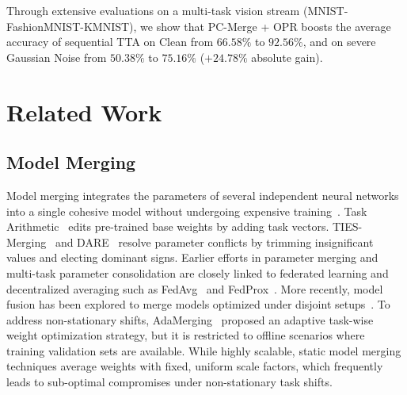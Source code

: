 \documentclass{article}
\theoremstyle{plain}
\theoremstyle{definition}
\theoremstyle{remark}
\begin{document}
Through extensive evaluations on a multi-task vision stream (MNIST-FashionMNIST-KMNIST), we show that PC-Merge + OPR boosts the average accuracy of sequential TTA on Clean from $66.58\%$ to $\mathbf{92.56\%}$, and on severe Gaussian Noise from $50.38\%$ to $\mathbf{75.16\%}$ ($+24.78\%$ absolute gain).

\section{Related Work}
\label{sec:related}

\subsection{Model Merging}
Model merging integrates the parameters of several independent neural networks into a single cohesive model without undergoing expensive training~\cite{wortsman2022robust, matena2021merging}. Task Arithmetic~\cite{ilharco2022editing} edits pre-trained base weights by adding task vectors. TIES-Merging~\cite{yadav2023resolving} and DARE~\cite{yu2024dare} resolve parameter conflicts by trimming insignificant values and electing dominant signs. Earlier efforts in parameter merging and multi-task parameter consolidation are closely linked to federated learning and decentralized averaging such as FedAvg~\cite{mcmahan2017communication} and FedProx~\cite{li2020federated}. More recently, model fusion has been explored to merge models optimized under disjoint setups~\cite{choshen2022fusing, jordan2024calibrating}. To address non-stationary shifts, AdaMerging~\cite{yang2024adamerging} proposed an adaptive task-wise weight optimization strategy, but it is restricted to offline scenarios where training validation sets are available. While highly scalable, static model merging techniques average weights with fixed, uniform scale factors, which frequently leads to sub-optimal compromises under non-stationary task shifts.
\end{document}
